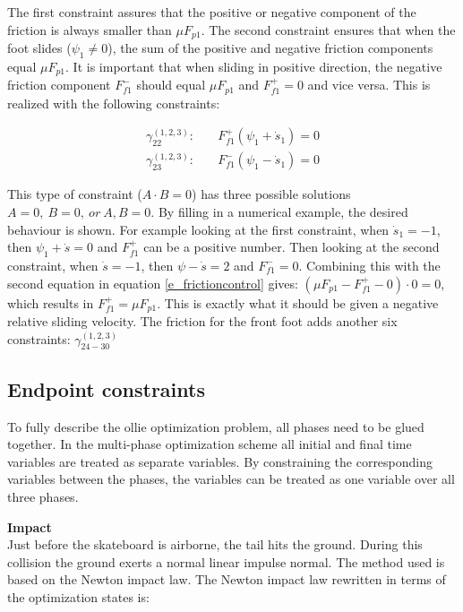 \documentclass[default,iicol]{sn-jnl}
\begin{document}
The first constraint assures that the positive or negative component of the
friction is always smaller than $\mu F_{p1}$. The second constraint ensures
that when the foot slides ($\psi_1 \not = 0$),  the sum of the positive and
negative friction components equal $\mu F_{p1}$. It is important that when
sliding in positive direction, the negative friction component $F_{f1}^-$
should equal $\mu F_{p1}$ and $F_{f1}^+=0$ and vice versa. This is realized
with the following constraints:

\begin{equation}
\begin{split}
    \gamma_{22}^{(1,2,3)}: \quad & F_{f1}^+ (\psi_1 + \dot s_1)  = 0 \\
    \gamma_{23}^{(1,2,3)}: \quad & F_{f1}^- (\psi_1 - \dot s_1)  = 0
\end{split}
\end{equation}

This type of constraint ($A\cdot B = 0$) has three possible solutions $A= 0,\
B=0,\ or\ A,B = 0$. By filling in a numerical example, the desired behaviour is
shown. For example looking at the first constraint, when $\dot s_1 = -1$, then
$\psi_1 + \dot s =  0$ and $F_{f1}^+$ can be a positive number. Then looking at
the second constraint, when $\dot s = -1$, then $\psi - \dot s = 2$ and
$F_{f1}^- = 0$. Combining this with the second equation in equation
\ref{e_frictioncontrol} gives: $(\mu F_{p1} - F_{f1}^+ - 0) \cdot 0 = 0$, which
results in $F_{f1}^+ = \mu F_{p1}$. This is exactly what it should be given a
negative relative sliding velocity. The friction for the front foot adds
another six constraints: $\gamma_{24-30}^{(1,2,3)}$

\subsection{Endpoint constraints} \label{p_endpoints}
To fully describe the ollie optimization problem, all phases need to be glued together. In the multi-phase optimization scheme all initial and final time variables are treated as separate variables. By constraining the corresponding variables between the phases, the variables can be treated as one variable over all three phases.

\textbf{Impact}\\
Just before the skateboard is airborne, the tail hits the ground. During this collision the ground exerts a normal linear impulse normal. The method used\cite{vallery_heike_advanced_2018} is based on the Newton impact law. The Newton impact law rewritten in terms of the optimization states is:
\end{document}
